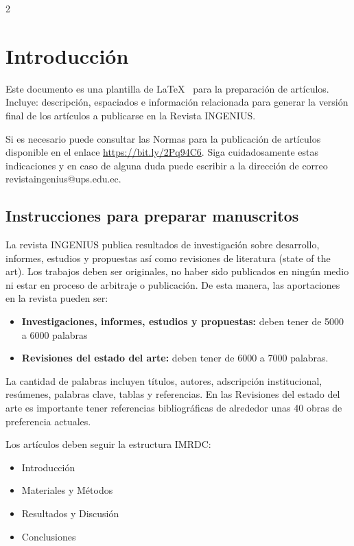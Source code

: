 \documentclass[12pt,twoside,titlepage]{ingenius}
\begin{document}
\newpage

\begin{multicols}{2}
\section{Introducción}
\vspace{-0.15cm}

Este documento es una plantilla de \LaTeX~ para la preparación de artículos. Incluye: descripción, espaciados e información relacionada para generar la versión final de los artículos a publicarse en la Revista INGENIUS. 
 
Si es necesario puede consultar las Normas para la publicación de artículos disponible en el enlace  \url{https://bit.ly/2Pq94C6}. 
Siga cuidadosamente estas indicaciones y en caso de alguna duda puede escribir a la dirección de correo revistaingenius@ups.edu.ec.

\subsection{Instrucciones para preparar manuscritos}

La revista INGENIUS publica resultados de investigación sobre desarrollo, informes, estudios y propuestas así como revisiones de literatura (state of the art). Los trabajos deben ser originales, no haber sido publicados en ningún medio ni estar en proceso de arbitraje o publicación. De esta manera, las aportaciones en la revista pueden ser:

\begin{itemize}
\item \textbf{Investigaciones, informes, estudios y propuestas:} deben tener de 5000 a 6000 palabras
\item \textbf{Revisiones del estado del arte:} deben tener de 6000 a 7000 palabras.
\end{itemize}

La cantidad de palabras incluyen títulos, autores, adscripción institucional,  resúmenes, palabras clave, tablas y referencias. En las Revisiones del estado del arte es importante tener referencias bibliográficas de alrededor unas 40 obras de preferencia actuales.

Los artículos deben seguir la estructura IMRDC:

\begin{itemize}
    \item Introducción
    \item Materiales y Métodos
    \item Resultados y Discusión
    \item Conclusiones
\end{itemize}


\end{multicols}
\end{document}

